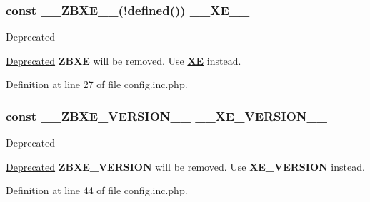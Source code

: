\subsubsection[{\texorpdfstring{\+\_\+\+\_\+\+Z\+B\+X\+E\+\_\+\+\_\+}{__ZBXE__}}]{\setlength{\rightskip}{0pt plus 5cm}const \+\_\+\+\_\+\+Z\+B\+X\+E\+\_\+\+\_\+(!defined(\textquotesingle{})) {\bf \+\_\+\+\_\+\+X\+E\+\_\+\+\_\+}}\hypertarget{config_8inc_8php_a5dee6469b95523a5bafe17e6b29c6bf7}{}\label{config_8inc_8php_a5dee6469b95523a5bafe17e6b29c6bf7}
\begin{DoxyRefDesc}{Deprecated}
\item[\hyperlink{deprecated__deprecated000011}{Deprecated}]{\bfseries Z\+B\+XE} will be removed. Use {\bfseries \hyperlink{namespaceXE}{XE}} instead. \end{DoxyRefDesc}


Definition at line 27 of file config.\+inc.\+php.

\subsubsection[{\texorpdfstring{\+\_\+\+\_\+\+Z\+B\+X\+E\+\_\+\+V\+E\+R\+S\+I\+O\+N\+\_\+\+\_\+}{__ZBXE_VERSION__}}]{\setlength{\rightskip}{0pt plus 5cm}const \+\_\+\+\_\+\+Z\+B\+X\+E\+\_\+\+V\+E\+R\+S\+I\+O\+N\+\_\+\+\_\+ {\bf \+\_\+\+\_\+\+X\+E\+\_\+\+V\+E\+R\+S\+I\+O\+N\+\_\+\+\_\+}}\hypertarget{config_8inc_8php_a0e70c145bf3712e075af5c3861045dc9}{}\label{config_8inc_8php_a0e70c145bf3712e075af5c3861045dc9}
\begin{DoxyRefDesc}{Deprecated}
\item[\hyperlink{deprecated__deprecated000012}{Deprecated}]{\bfseries Z\+B\+X\+E\+\_\+\+V\+E\+R\+S\+I\+ON} will be removed. Use {\bfseries X\+E\+\_\+\+V\+E\+R\+S\+I\+ON} instead. \end{DoxyRefDesc}


Definition at line 44 of file config.\+inc.\+php.

